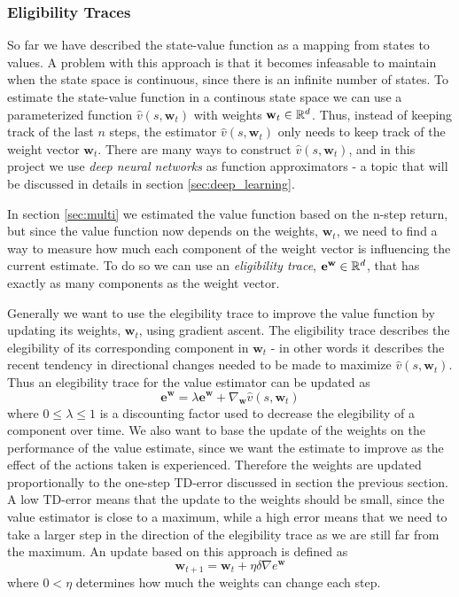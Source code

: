 \documentclass[11pt]{article}
\begin{document}
\subsubsection{Eligibility Traces}\label{sec:et}

So far we have described the state-value function as a mapping from states to values.
A problem with this approach is that it becomes infeasable to maintain 
when the state space is continuous, since there is an infinite number of states.
To estimate the state-value function in a continous state space we can use a
parameterized function $\hat{v}(s, \mathbf{w}_t)$ with weights $\mathbf{w}_t \in \mathbb{R}^d$.
Thus, instead of keeping track of the last $n$ steps, the estimator $\hat{v}(s, \mathbf{w}_t)$
only needs to keep track of the weight vector $\mathbf{w}_t$.
There are many ways to construct $\hat{v}(s, \mathbf{w}_t)$, and in this project we use \textit{deep neural networks}
as function approximators - a topic that will be discussed in details in section \ref{sec:deep_learning}.

In section \ref{sec:multi} we estimated the value function based on the n-step return, but
since the value function now depends on the weights, $\mathbf{w}_t$, we need to find a way
to measure how much each component of the weight vector is influencing the
current estimate.
To do so we can use an \textit{eligibility trace}, $\mathbf{e}^{\mathbf{w}} \in \mathbb{R}^d$, that
has exactly as many components as the weight vector.

Generally we want to use the elegibility trace to improve the value function by
updating its weights, $\mathbf{w}_t$, using gradient ascent.
The eligibility trace describes the elegibility of its corresponding component in $\mathbf{w}_t$
- in other words it describes the recent tendency in directional changes needed to be made
to maximize $\hat{v}(s, \mathbf{w}_t)$.
Thus an elegibility trace for the value estimator can be updated as
\begin{equation}
    \mathbf{e}^\mathbf{w} = \lambda \mathbf{e}^\mathbf{w} + \nabla_\mathbf{w} \hat{v}(s, \mathbf{w}_t)
\end{equation}
where $0 \leq \lambda \leq 1$ is a discounting factor used to decrease the elegibility of a component
over time.
We also want to base the update of the weights on the performance of the value estimate,
since we want the estimate to improve as the effect of the actions taken is experienced.
Therefore the weights are updated proportionally to the one-step TD-error discussed in section the previous
section.
A low TD-error means that the update to the weights should be small, since the value estimator is
close to a maximum, while a high error means that we need to take a larger step
in the direction of the elegibility trace as we are still far from the maximum.
An update based on this approach is defined as
\begin{equation}
    \mathbf{w}_{t+1} = \mathbf{w}_t + \eta \delta \nabla e^\mathbf{w}
\end{equation}
where $0 < \eta$ determines how much the weights can change each step.
\end{document}
